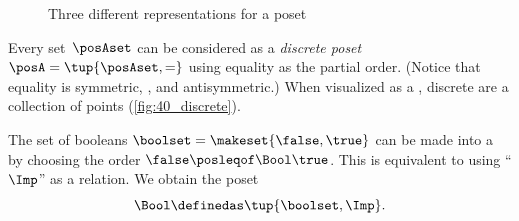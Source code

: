 \begin{figure}[h!]
    \hspace{4em}
    \hspace{4em}
    \hspace{4em}
    \caption{Three different representations for a poset}
    \label{fig:poset_representation}
\end{figure}

\clearpage
\begin{marginfigure}
    \centering
    \caption{}
    \label{fig:40_discrete}
\end{marginfigure}

\begin{example}

    \label{ex:discreteposet}
    Every set~$\posAset$ can be considered as a \emph{discrete poset}~$\posA = \tup{\posAset,{{=}}}$ using equality as the partial order.
    (Notice that equality is symmetric, , and antisymmetric.)
    When visualized as a , discrete  are a collection of points (\cref{fig:40_discrete}).
\end{example}
\vspace{1cm}
\begin{marginfigure}[4mm]
    \centering
    \caption{}
\end{marginfigure}

\begin{definition}
    \label{def:bool-poset}
    The set of booleans $\boolset = \makeset{\false, \true}$ can be made into a  by choosing the order $\false \posleqof\Bool \true$.
    This is equivalent to using ``$\Imp$'' as a relation.
    We obtain the poset
    \begin{equation}
        \label{eq:bool-poset}
        \Bool \definedas \tup{\boolset, {{\Imp}}}.
    \end{equation}
\end{definition}

